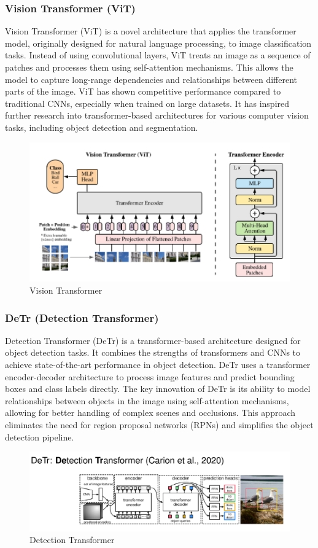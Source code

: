 \subsubsection{Vision Transformer (ViT)}

Vision Transformer (ViT) is a novel architecture that applies the transformer model, originally designed for natural language processing, to image classification tasks. Instead of using convolutional layers, ViT treats an image as a sequence of patches and processes them using self-attention mechanisms. This allows the model to capture long-range dependencies and relationships between different parts of the image.
ViT has shown competitive performance compared to traditional CNNs, especially when trained on large datasets. It has inspired further research into transformer-based architectures for various computer vision tasks, including object detection and segmentation.
\begin{figure}[htbp]
   \centering
   \includegraphics{images/10/vit.png}
   \caption{Vision Transformer}
   \label{fig:10/vit}
\end{figure}

\subsubsection{DeTr (Detection Transformer)}
Detection Transformer (DeTr) is a transformer-based architecture designed for object detection tasks. It combines the strengths of transformers and CNNs to achieve state-of-the-art performance in object detection. DeTr uses a transformer encoder-decoder architecture to process image features and predict bounding boxes and class labels directly.
The key innovation of DeTr is its ability to model relationships between objects in the image using self-attention mechanisms, allowing for better handling of complex scenes and occlusions. This approach eliminates the need for region proposal networks (RPNs) and simplifies the object detection pipeline.
\begin{figure}[htbp]
   \centering
   \includegraphics{images/10/detr.png}
   \caption{Detection Transformer}
   \label{fig:10/detr}
\end{figure}
